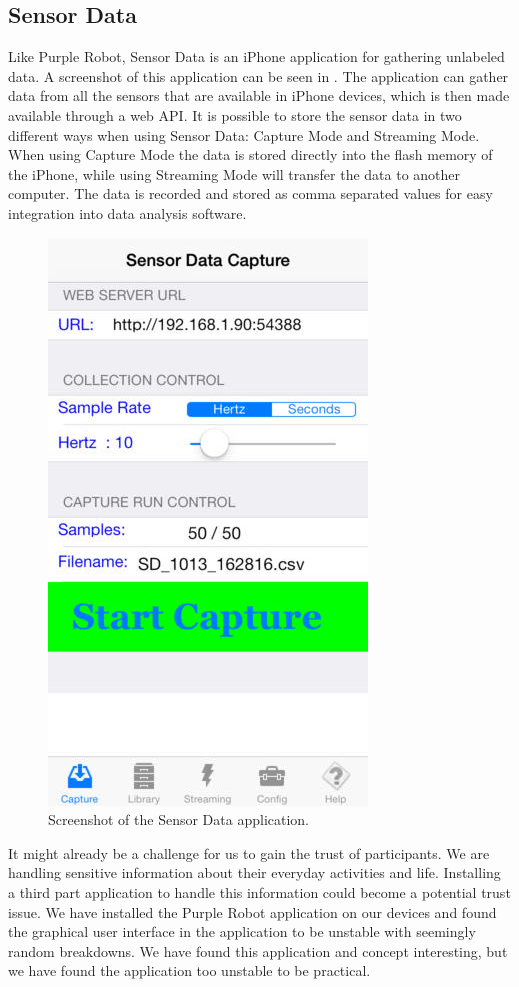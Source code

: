 \subsection{Sensor Data}
\label{sub:sensor_data}
Like Purple Robot, Sensor Data is an iPhone application for gathering unlabeled data. A screenshot of this application can be seen in . The application can gather data from all the sensors that are available in iPhone devices, which is then made available through a web API. It is possible to store the sensor data in two different ways when using Sensor Data: Capture Mode and Streaming Mode. When using Capture Mode the data is stored directly into the flash memory of the iPhone, while using Streaming Mode will transfer the data to another computer. The data is recorded and stored as comma separated values for easy integration into data analysis software.

\begin{figure}[!htbp]
	\centering
	\includegraphics[height=0.5\textwidth]{graphic/existing_solutions/sensor_data}
	\caption[]{Screenshot of the Sensor Data application\footnotemark.}
	\label{fig:sensor_data_screenshot}
\end{figure}
\FloatBarrier
{}

It might already be a challenge for us to gain the trust of participants. We are handling sensitive information about their everyday activities and life. Installing a third part application to handle this information could become a potential trust issue. We have installed the Purple Robot application on our devices and found the graphical user interface in the application to be unstable with seemingly random breakdowns. We have found this application and concept interesting, but we have found the application too unstable to be practical. 